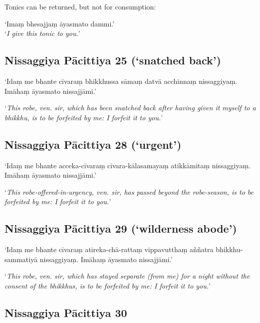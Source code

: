 Tonics can be returned, but not for consumption:

‘Imaṃ bhesajjaṃ āyasmato dammi.’\\
‘\emph{I give this tonic to you.}’ 

\subsection{Nissaggiya Pācittiya 25 (‘snatched back’)}

‘Idaṃ me bhante cīvaraṃ bhikkhussa sāmaṃ datvā acchinnaṃ nissaggiyaṃ. Imāhaṃ
āyasmato nissajjāmi.’

‘\emph{This robe, ven. sir, which has been snatched back after having given it
  myself to a bhikkhu, is to be forfeited by me: I forfeit it to you.}’



\subsection{Nissaggiya Pācittiya 28 (‘urgent’)}

‘Idaṃ me bhante acceka-cīvaraṃ cīvara-kālasamayaṃ atikkāmitaṃ nissaggiyaṃ.
Imāhaṃ āyasmato nissajjāmi.’

‘\emph{This robe-offered-in-urgency, ven. sir, has passed beyond the
  robe-season, is to be forfeited by me: I forfeit it to you.}’



\subsection{Nissaggiya Pācittiya 29 (‘wilderness abode’)}

‘Idaṃ me bhante cīvaraṃ atireka-chā-rattaṃ vippavutthaṃ aññatra
bhikkhu-sammatiyā nissaggiyaṃ. Imāhaṃ āyasmato nissajjāmi.’

‘\emph{This robe, ven. sir, which has stayed separate (from me) for a night
  without the consent of the bhikkhus, is to be forfeited by me: I forfeit it to
  you.}’



\subsection{Nissaggiya Pācittiya 30}

